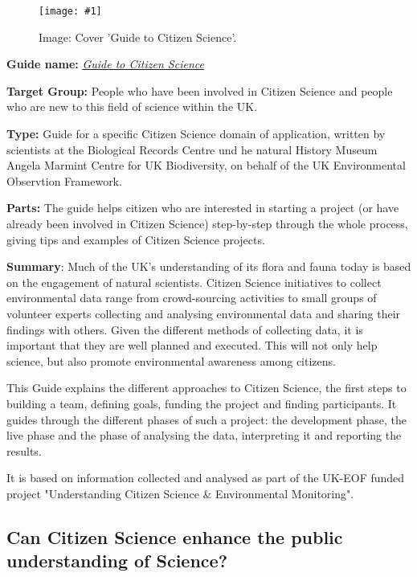 \documentclass{article}
\newlength{\imgwidth}
\newcommand\scaledgraphics[2]{%
                
\settowidth{\imgwidth}{\texttt{[image: \#1]}}%
                
\setlength{\imgwidth}{\minof{\imgwidth}{#2\textwidth}}%
                
\texttt{[image: \#1]}%
                
}
\begin{document}
\begin{center}
\begin{figure}
\scaledgraphics{bfcdb806-4a62-40b9-92f8-a4b78de8ea77.png}{0.5}
\caption*{Image: Cover 'Guide to Citizen Science'.}\label{F60825051}
\end{figure}


\end{center}


\textbf{Guide name: }\emph{\href{https://www.ceh.ac.uk/sites/default/files/citizenscienceguide.pdf}{Guide to Citizen Science}}\textbf{ } \autocite{tweddle_guide_2012}


\textbf{Target Group: }People who have been involved in Citizen Science and people who are new to this field of science within the UK.


\textbf{Type: }Guide for a specific Citizen Science domain of application, written by scientists at the Biological Records Centre und he natural History Museum Angela Marmint Centre for UK Biodiversity, on behalf of the UK Environmental Observtion Framework.


\textbf{Parts: }The guide helps citizen who are interested in starting a project (or have already been involved in Citizen Science) step-by-step through the whole process, giving tips and examples of Citizen Science projects.


\textbf{Summary}: Much of the UK's understanding of its flora and fauna today is based on the engagement of natural scientists. Citizen Science initiatives to collect environmental data range from crowd-sourcing activities to small groups of volunteer experts collecting and analysing environmental data and sharing their findings with others. Given the different methods of collecting data, it is important that they are well planned and executed. This will not only help science, but also promote environmental awareness among citizens.


This Guide explains the different approaches to Citizen Science, the first steps to building a team, defining goals, funding the project and finding participants. It guides through the different phases of such a project: the development phase, the live phase and the phase of analysing the data, interpreting it and reporting the results.


It is based on information collected and analysed as part of the UK-EOF funded project "Understanding Citizen Science \& Environmental Monitoring".


\subsection{Can Citizen Science enhance the public understanding of Science?}\label{H2333653}
\end{document}
